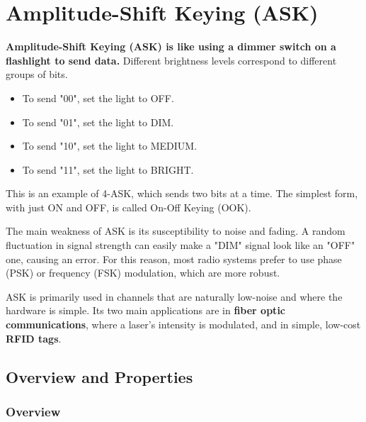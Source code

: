 
\chapter{Amplitude-Shift Keying (ASK)}
\label{ch:ask}

\begin{nontechnical}
    \textbf{Amplitude-Shift Keying (ASK) is like using a dimmer switch on a flashlight to send data.} Different brightness levels correspond to different groups of bits.

    \begin{itemize}
        \item To send "00", set the light to OFF.
        \item To send "01", set the light to DIM.
        \item To send "10", set the light to MEDIUM.
        \item To send "11", set the light to BRIGHT.
    \end{itemize}
    This is an example of 4-ASK, which sends two bits at a time. The simplest form, with just ON and OFF, is called On-Off Keying (OOK).

     The main weakness of ASK is its susceptibility to noise and fading. A random fluctuation in signal strength can easily make a "DIM" signal look like an "OFF" one, causing an error. For this reason, most radio systems prefer to use phase (PSK) or frequency (FSK) modulation, which are more robust.

     ASK is primarily used in channels that are naturally low-noise and where the hardware is simple. Its two main applications are in \textbf{fiber optic communications}, where a laser's intensity is modulated, and in simple, low-cost \textbf{RFID tags}.
\end{nontechnical}


\section{Overview and Properties}

\subsection{Overview}

